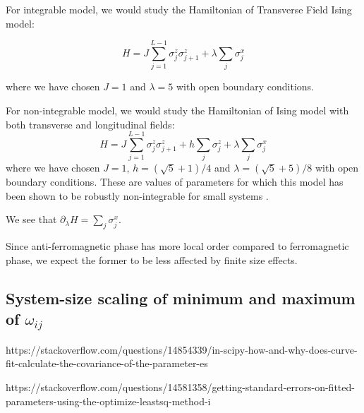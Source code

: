 \documentclass[11pt,a4paper]{article}
\begin{document}
For integrable model, we would study the Hamiltonian of Transverse Field Ising model:

\begin{equation}
H= J \sum_{j=1}^{L-1} \sigma_j^z \sigma_{j+1}^z + \lambda \sum_{j} \sigma_j^x
\end{equation}


where we have chosen $J=1$ and $\lambda=5$ with open boundary conditions.

For non-integrable model, we would study the Hamiltonian of Ising model with both transverse and longitudinal fields:
\begin{equation}
H= J \sum_{j=1}^{L-1} \sigma_j^z \sigma_{j+1}^z + h\sum_{j} \sigma_j^z +\lambda \sum_{j} \sigma_j^x 
\end{equation}
%
where we have chosen $J=1$, $h= (\sqrt{5}+1)/4$ and $\lambda=(\sqrt{5}+5)/8$ with open boundary conditions. These are values of parameters for which this model has been shown to be robustly non-integrable for small systems \cite{kim2013ballistic}.

We see that $\partial_{\lambda}H =  \sum_{j} \sigma_j^x  $.

Since anti-ferromagnetic phase has more local order compared to ferromagnetic phase, we expect the former to be less affected by finite size effects.


\subsection{System-size scaling of minimum and maximum of $\omega_{ij}$}

 
https://stackoverflow.com/questions/14854339/in-scipy-how-and-why-does-curve-fit-calculate-the-covariance-of-the-parameter-es

https://stackoverflow.com/questions/14581358/getting-standard-errors-on-fitted-parameters-using-the-optimize-leastsq-method-i 
 
\end{document}
